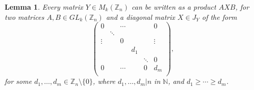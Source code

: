 \documentclass[11pt]{article}
\newtheorem{lemma}[thm]{Lemma}
\numberwithin{equation}{section}
\newcommand{\Z}{\mathbb{Z}}
\begin{document}
\begin{lemma}
  Every matrix $Y \in M_k(\Z_n)$ can be written as a product $AXB$, for two
  matrices $A, B \in GL_k(\Z_n)$ and a diagonal matrix $X \in J_Y$ of the form 
  $$\begin{pmatrix}
      0      &        & \cdots &        &        & 0       \\
             & \ddots &        &        &        &         \\
      \vdots &        & 0      &        &        & \vdots  \\
             &        &        & d_1    &        &         \\
             &        &        &        & \ddots & 0       \\
      0      &        & \cdots &        & 0      & d_m     \\
    \end{pmatrix},$$
    for some $d_1, \ldots, d_m \in \Z_n \setminus \{0\}$,
    where $d_1, \ldots, d_m | n$ in $\mathbb{N}$,
    and $d_1 \geq \cdots \geq d_m$.
\end{lemma}
\end{document}
